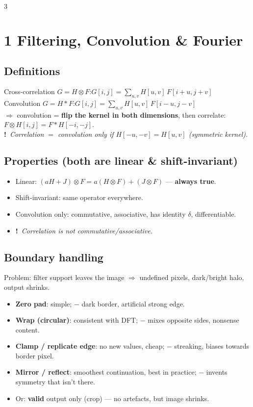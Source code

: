 \documentclass[9pt,a4paper,landscape]{extarticle}
\newcommand{\key}[1]{\textbf{#1}}
\newcommand{\tr}[1]{{\color{trap}\textbf{!}}\ \textit{#1}}
\begin{document}
\begin{multicols}{3}

\section{1 \; Filtering, Convolution \& Fourier}

\subsection{Definitions}
Cross-correlation $G=H\otimes F$:\quad $G[i,j]=\sum_{u,v}H[u,v]\,F[i+u,j+v]$\\
Convolution $G=H*F$:\quad $G[i,j]=\sum_{u,v}H[u,v]\,F[i-u,j-v]$\\
$\Rightarrow$ convolution = \key{flip the kernel in both dimensions}, then correlate: $F\otimes H[i,j]=F*H[-i,-j]$.\\
\tr{Correlation $=$ convolution \emph{only} if $H[-u,-v]=H[u,v]$ (symmetric kernel).}

\subsection{Properties (both are linear \& shift-invariant)}
\begin{itemize}
\item Linear: $(aH+J)\otimes F=a(H\otimes F)+(J\otimes F)$ --- \key{always true}.
\item Shift-invariant: same operator everywhere.
\item Convolution only: commutative, associative, has identity $\delta$, differentiable.
\item \tr{Correlation is \emph{not} commutative/associative.}
\end{itemize}

\subsection{Boundary handling}
Problem: filter support leaves the image $\Rightarrow$ undefined pixels, dark/bright halo, output shrinks.
\begin{itemize}
\item \key{Zero pad}: simple; $-$ dark border, artificial strong edge.
\item \key{Wrap (circular)}: consistent with DFT; $-$ mixes opposite sides, nonsense content.
\item \key{Clamp / replicate edge}: no new values, cheap; $-$ streaking, biases towards border pixel.
\item \key{Mirror / reflect}: smoothest continuation, best in practice; $-$ invents symmetry that isn't there.
\item Or: \key{valid} output only (crop) --- no artefacts, but image shrinks.
\end{itemize}


\end{multicols}
\end{document}

